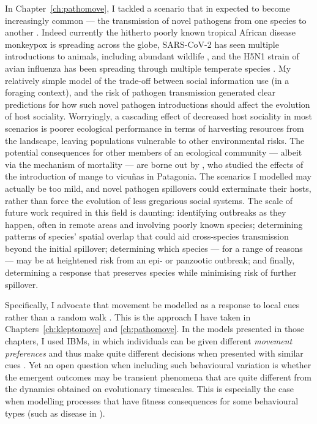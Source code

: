 In Chapter~\ref{ch:pathomove}, I tackled a scenario that in expected to become increasingly common --- the transmission of novel pathogens from one species to another \citep{carlson2022a}.
Indeed currently the hitherto poorly known tropical African disease monkeypox is spreading across the globe, SARS-CoV-2 has seen multiple introductions to animals, including abundant wildlife \citep{kuchipudi2022}, and the H5N1 strain of avian influenza has been spreading through multiple temperate species \citep{wille2022}.
My relatively simple model of the trade-off between social information use (in a foraging context), and the risk of pathogen transmission generated clear predictions for how such novel pathogen introductions should affect the evolution of host sociality.
Worryingly, a cascading effect of decreased host sociality in most scenarios is poorer ecological performance in terms of harvesting resources from the landscape, leaving populations vulnerable to other environmental risks.
The potential consequences for other members of an ecological community --- albeit via the mechanism of mortality --- are borne out by \citet{monk2022}, who studied the effects of the introduction of mange to vicu\~{n}as in Patagonia.
The scenarios I modelled may actually be too mild, and novel pathogen spillovers could exterminate their hosts, rather than force the evolution of less gregarious social systems.
The scale of future work required in this field is daunting: identifying outbreaks as they happen, often in remote areas and involving poorly known species; determining patterns of species' spatial overlap that could aid cross-species transmission beyond the initial spillover; determining which species --- for a range of reasons --- may be at heightened risk from an epi- or panzootic outbreak; and finally, determining a response that preserves species while minimising risk of further spillover.

Specifically, I advocate that movement be modelled as a response to local cues rather than a random walk \citep[`mechanistic'; see][]{mueller2011}.
This is the approach I have taken in Chapters~\ref{ch:kleptomove} and \ref{ch:pathomove}.
In the models presented in those chapters, I used IBMs, in which individuals can be given different \emph{movement preferences} and thus make quite different decisions when presented with similar cues \citep{getz2015,white2018}.
Yet an open question when including such behavioural variation is whether the emergent outcomes may be transient phenomena that are quite different from the dynamics obtained on evolutionary timescales.
This is especially the case when modelling processes that have fitness consequences for some behavioural types (such as disease in \cite[]{white2018}).

